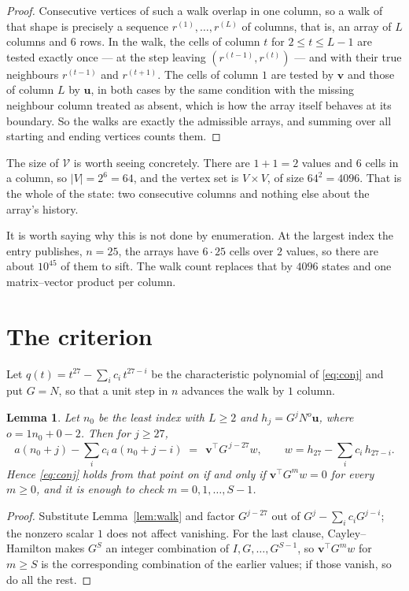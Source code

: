 \documentclass[11pt,a4paper]{article}
\theoremstyle{plain}
\newtheorem{lemma}[theorem]{Lemma}
\theoremstyle{definition}
\begin{document}
\begin{proof}
Consecutive vertices of such a walk overlap in one column, so a walk of that shape is
precisely a sequence $r^{(1)},\dots,r^{(L)}$ of columns, that is, an array of $L$ columns
and $6$ rows. In the walk, the cells of column $t$ for $2\le t\le L-1$ are tested
exactly once --- at the step leaving $(r^{(t-1)},r^{(t)})$ --- and with their true
neighbours $r^{(t-1)}$ and $r^{(t+1)}$. The cells of column $1$ are tested by
$\mathbf{v}$ and those of column $L$ by $\mathbf{u}$, in both cases by the same condition
with the missing neighbour column treated as absent, which is how the array itself behaves at
its boundary. So the walks are exactly the admissible arrays, and summing over all starting
and ending vertices counts them.
\end{proof}


The size of $\mathcal V$ is worth seeing concretely. There are $1+1=2$ values
and $6$ cells in a column, so $|V|=2^{6}=64$, and the vertex set is
$V\times V$, of size $64^2=4096$. That is the whole of the state: two consecutive
columns and nothing else about the array's history.

It is worth saying why this is not done by enumeration. At the largest index the entry
publishes, $n=25$, the arrays have $6\cdot25$ cells over
$2$ values, so there are about $10^{45}$ of them to sift. The
walk count replaces that by $4096$ states and one matrix--vector product per column.
\section{The criterion}

Let $q(t)=t^{27}-\sum_i c_i\,t^{27-i}$ be the characteristic polynomial of
\eqref{eq:conj} and put $G=N$, so that a unit step in $n$ advances the walk by
$1$ column.

\begin{lemma}\label{lem:crit}
Let $n_0$ be the least index with $L\ge2$ and $h_j=G^{j}N^{o}\mathbf{u}$, where
$o=1n_0+0-2$. Then for $j\ge27$,
\[
a(n_0+j)-\sum_i c_i\,a(n_0+j-i)\;=\;\,\mathbf{v}^{\!\top}G^{\,j-27}w,
\qquad w=h_{27}-\sum_i c_i\,h_{27-i} .
\]
Hence \eqref{eq:conj} holds from that point on if and only if
$\mathbf{v}^{\!\top}G^{m}w=0$ for every $m\ge0$, and it is enough to check
$m=0,1,\dots,S-1$.
\end{lemma}

\begin{proof}
Substitute Lemma~\ref{lem:walk} and factor $G^{j-27}$ out of
$G^{j}-\sum_ic_iG^{j-i}$; the nonzero scalar $1$ does not affect
vanishing. For the last clause, Cayley--Hamilton makes $G^{S}$ an integer combination of
$I,G,\dots,G^{S-1}$, so $\mathbf{v}^{\!\top}G^{m}w$ for $m\ge S$ is the corresponding
combination of the earlier values; if those vanish, so do all the rest.
\end{proof}
\end{document}
